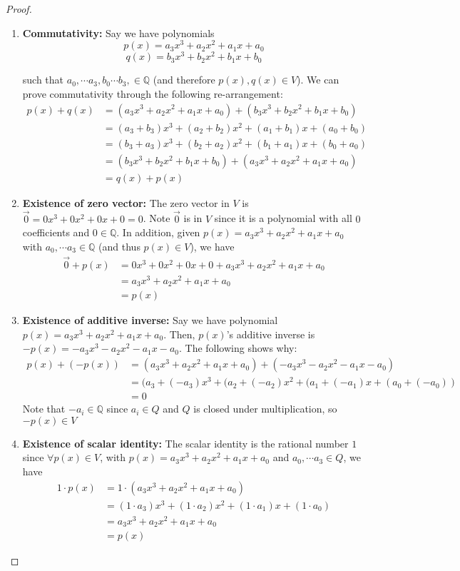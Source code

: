\documentclass[11pt]{article}
\newcommand{\Q}{\mathbb{Q}}
\begin{document}
\begin{proof}
\begin{enumerate}
\item \textbf{Commutativity:} Say we have polynomials
$$p(x) = a_3x^3 + a_2x^2 + a_1x + a_0$$
$$q(x) = b_3x^3 + b_2x^2 + b_1x + b_0$$ 

such that $a_0, \cdots a_3, b_0 \cdots b_3, \in \Q$ (and therefore $p(x), q(x) \in V$). We can prove commutativity through the following re-arrangement:
\begin{align*}
p(x) + q(x) &= (a_3x^3 + a_2x^2 + a_1x + a_0) + (b_3x^3 + b_2x^2 + b_1x + b_0) \\
            &= (a_3+b_3)x^3 + (a_2+b_2)x^2 + (a_1+b_1)x + (a_0+b_0) \\
            &= (b_3+a_3)x^3 + (b_2+a_2)x^2 + (b_1+a_1)x + (b_0+a_0) \\
            &= (b_3x^3 + b_2x^2 + b_1x + b_0) + (a_3x^3 + a_2x^2 + a_1x + a_0) \\
            &= q(x) + p(x)
\end{align*}

\item \textbf{Existence of zero vector:} The zero vector in $V$ is $\vec{0} = 0x^3 + 0x^2 + 0x + 0 = 0$. Note $\vec{0}$ is in $V$ since it is a polynomial with all $0$ coefficients and $0\in \Q$. In addition, given $p(x) = a_3x^3 + a_2x^2 + a_1x + a_0$ with $a_0, \cdots a_3 \in \Q$ (and thus $p(x)\in V$), we have
\begin{align*}
\vec{0} + p(x)  &= 0x^3 + 0x^2 + 0x + 0 + a_3x^3 + a_2x^2 + a_1x + a_0 \\
                &= a_3x^3 + a_2x^2 + a_1x + a_0 \\
                &= p(x)
\end{align*}
\item \textbf{Existence of additive inverse:} Say we have polynomial $p(x) = a_3x^3 + a_2x^2 + a_1x + a_0$. Then, $p(x)$'s additive inverse is $-p(x) = -a_3x^3 - a_2x^2 - a_1x - a_0$. The following shows why:
\begin{align*}
p(x) + (-p(x))  &= (a_3x^3 + a_2x^2 + a_1x + a_0) + (-a_3x^3 - a_2x^2 - a_1x - a_0) \\
                &= (a_3+(-a_3)x^3 + (a_2+(-a_2)x^2 + (a_1+(-a_1)x + (a_0 + (-a_0)) \\
                &= 0
\end{align*}
Note that $-a_i \in \Q$ since $a_i \in Q$ and $Q$ is closed under multiplication, so $-p(x) \in V$

\item \textbf{Existence of scalar identity:} The scalar identity is the rational number $1$ since $\forall p(x) \in V$, with $p(x)=a_3x^3 + a_2x^2 + a_1x + a_0$ and $a_0, \cdots a_3\in Q$, we have
\begin{align*}
1 \cdot p(x)  &= 1\cdot (a_3x^3 + a_2x^2 + a_1x + a_0)  \\
                &= (1\cdot a_3)x^3 + (1\cdot a_2)x^2 + (1\cdot a_1)x + (1 \cdot a_0) \\
                &= a_3x^3 + a_2x^2 + a_1x + a_0 \\
                &= p(x)
\end{align*}


\end{enumerate}
\end{proof}
\end{document}
